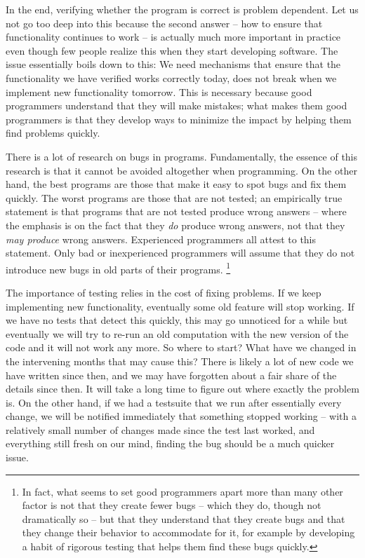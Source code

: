 \documentclass{article}
\begin{document}
In the end, verifying whether the program is correct is problem dependent. Let
us not go too deep into this because the second answer -- how to ensure that
functionality continues to work -- is actually much more important in practice
even though few people realize this when they start developing software. The
issue essentially boils down to this: We need mechanisms that ensure that
the functionality we have verified works correctly today, does not break when
we implement new functionality tomorrow. This is necessary because good programmers
understand that they will make mistakes; what makes them good programmers is
that they develop ways to minimize the impact by helping them find problems
quickly. 

There is a lot of research on bugs in programs. Fundamentally, the essence of
this research is that it cannot be avoided altogether when programming. On the
other hand, the best programs are those that make it easy to spot bugs and fix
them quickly. The worst programs are those that are not tested; an empirically
true statement is that programs that are not tested produce wrong answers --
where the emphasis is on the fact that they \textit{do} produce wrong answers,
not that they \textit{may produce} wrong answers. Experienced programmers all
attest to this statement. Only bad or inexperienced programmers will assume
that they do not introduce new bugs in old parts of their programs.%
\footnote{In fact, what seems to set good programmers apart more than many
  other factor is not that they create fewer bugs -- which they do, though not
  dramatically so -- but that they understand that they create bugs and that
  they change their behavior to accommodate for it, for example by developing
  a habit of rigorous testing that helps them find these bugs quickly.}

The importance of testing relies in the cost of fixing problems. If we keep
implementing new functionality, eventually some old feature will stop
working. If we have no tests that detect this quickly, this may go unnoticed
for a while but eventually we will try to re-run an old computation with the
new version of the code and it will not work any more. So where to start? What
have we changed in the intervening months that may cause this? There is likely
a lot of new code we have written since then, and we may have forgotten about
a fair share of the details since then. It will take a long time to figure out
where exactly the problem is. On the other hand, if we had a testsuite that we
run after essentially every change, we will be notified immediately that something stopped
working -- with a relatively small number of changes made since
the test last worked, and everything still fresh on our mind, finding the bug
should be a much quicker issue.
\end{document}
